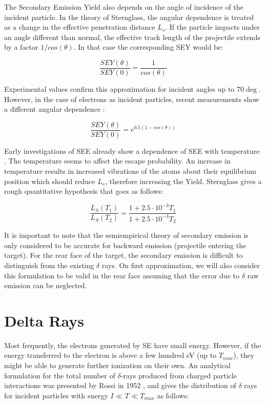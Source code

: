The Secondary Emission Yield also depends on the angle of incidence of the incident particle. In the theory of Sternglass, the angular dependence is treated as a change in the effective penetration distance $L_{s}$. If the particle impacts under an angle different than normal, the effective track length of the projectile extends by a factor $1/cos(\theta)$. In that case the corresponding SEY would be: 

\begin{equation}
    \frac{SEY(\theta)}{SEY(0)} = \frac{1}{cos(\theta)}
\end{equation}

Experimental values confirm this approximation for incident angles up to $70\deg$. However, in the case of electrons as incident particles, recent measurements show a different angular dependence \parencite*[][]{ref:seyAngleEl}: 

\begin{equation}
    \frac{SEY(\theta)}{SEY(0)} = e^{0.5 \left(1-cos(\theta)\right)}
\end{equation}

Early investigations of SEE already show a dependence of SEE with temperature \parencite*[][]{ref:SeyVsTemp}. The temperature seems to affect the escape probability. An increase in temperature results in increased vibrations of the atoms about their equilibrium position which should reduce $L_{s}$, therefore increasing the Yield. Sternglass gives a rough quantitative hypothesis that goes as follows: 

\begin{equation}
    \frac{L_S (T_1)}{L_S(T_2)} = \frac{1+2.5\cdot 10^{-3}T_1}{1+2.5\cdot 10^{-3}T_2}
\end{equation}

It is important to note that the semiempirical theory of secondary emission is only considered to be accurate for backward emission (projectile entering the target). For the rear face of the target, the secondary emission is difficult to distinguish from the existing $\delta$ rays. On first approximation, we will also consider this formulation to be valid in the rear face assuming that the error due to $\delta$ raw emission can be neglected.  

\section{Delta Rays}

Most frequently, the electrons generated by SE have small energy. However, if the energy transferred to the electron is above a few hundred \si[]{\electronvolt} (up to $T_{max}$), they might be able to generate further ionization on their own. An analytical formulation for the total number of $\delta$-rays produced from charged particle interactions was presented by Rossi in 1952 \parencite*[][]{ref:delta1}, and gives the distribution of $\delta$ rays for incident particles with energy $I \ll T \ll T_{max}$ as follows: 

